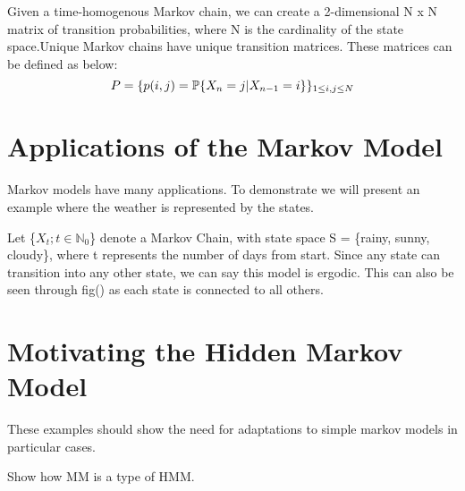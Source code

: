 Given a time-homogenous Markov chain, we can create a 2-dimensional N x N matrix of transition probabilities, where N is the cardinality of the state space.Unique Markov chains have unique transition matrices. These matrices can be defined as below:
\begin{equation}
	P = \{ p(i,j) = \mathbb{P} \{ X_n = j | X_{n-1} = i \}\}_{1 \leq i,j \leq N}
\end{equation}

\section{Applications of the Markov Model}
Markov models have many applications. To demonstrate we will present an example where the weather is represented by the states.  

\begin{example}
\label{weathermarkovchain}
	Let \{$X_t ; t \in \mathbb{N}_0$\} denote a Markov Chain, with state space S = \{rainy, sunny, 				cloudy\}, where t represents the number of days from start. Since any state can transition into any 		other state, we can say this model is ergodic. This can also be seen through fig() as each state is 		connected to all others. 
	
	\centering
    

\end{example}

\section{Motivating the Hidden Markov Model}
These examples should show the need for adaptations to simple markov models in particular cases. 

\begin{example}
\label{}
\end{example}

Show how MM is a type of HMM.